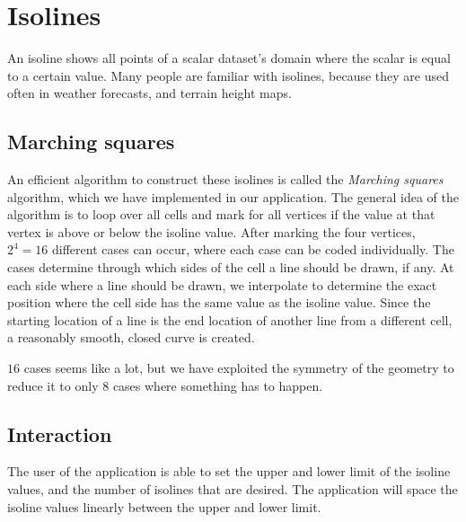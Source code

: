 \section{Isolines}
An isoline shows all points of a scalar dataset's domain where the scalar is equal to a certain value.
Many people are familiar with isolines, because they are used often in weather forecasts, and terrain height maps.

\subsection{Marching squares}
An efficient algorithm to construct these isolines is called the \textit{Marching squares}\cite{maple2003geometric} algorithm, which we have implemented in our application.
The general idea of the algorithm is to loop over all cells and mark for all vertices if the value at that vertex is above or below the isoline value.
After marking the four vertices, \(2^4=16\) different cases can occur, where each case can be coded individually.
The cases determine through which sides of the cell a line should be drawn, if any.
At each side where a line should be drawn, we interpolate to determine the exact position where the cell side has the same value as the isoline value.
Since the starting location of a line is the end location of another line from a different cell, a reasonably smooth, closed curve is created.

\(16\) cases seems like a lot, but we have exploited the symmetry of the geometry to reduce it to only \(8\) cases where something has to happen.

\subsection{Interaction}
The user of the application is able to set the upper and lower limit of the isoline values, and the number of isolines that are desired.
The application will space the isoline values linearly between the upper and lower limit.